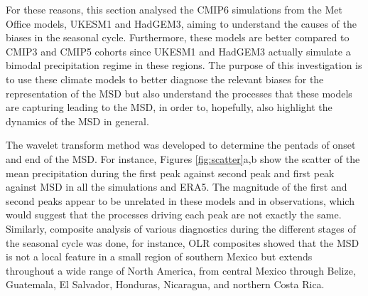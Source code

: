 For these reasons, this section analysed the CMIP6 simulations from the Met Office models, UKESM1 and HadGEM3, aiming to understand the causes of the biases in the seasonal cycle. Furthermore, these models are better compared to CMIP3 and CMIP5 cohorts since UKESM1 and HadGEM3 actually simulate a bimodal precipitation regime in these regions. 
The purpose of this investigation is to use these climate models to better diagnose the relevant biases for the representation of the MSD but also understand the processes that these models are capturing leading to the MSD, in order to, hopefully, also highlight the dynamics of the MSD in general. 







 The wavelet transform method was developed to determine the pentads of onset and end of the MSD.  For instance, Figures \ref{fig:scatter}a,b show the scatter of the mean precipitation during the first peak against second peak and first peak against MSD in all the simulations and ERA5. The magnitude of the first and second peaks appear to be unrelated in these models and in observations, which would suggest that the processes driving each peak are not exactly the same.
 Similarly, composite analysis of various diagnostics during the different stages of the seasonal cycle was done, for instance,  OLR composites showed that the MSD is not a local feature in a small region of southern Mexico but extends throughout a wide range of North America,  from central Mexico through Belize, Guatemala, El Salvador, Honduras, Nicaragua, and northern Costa Rica. %
 
